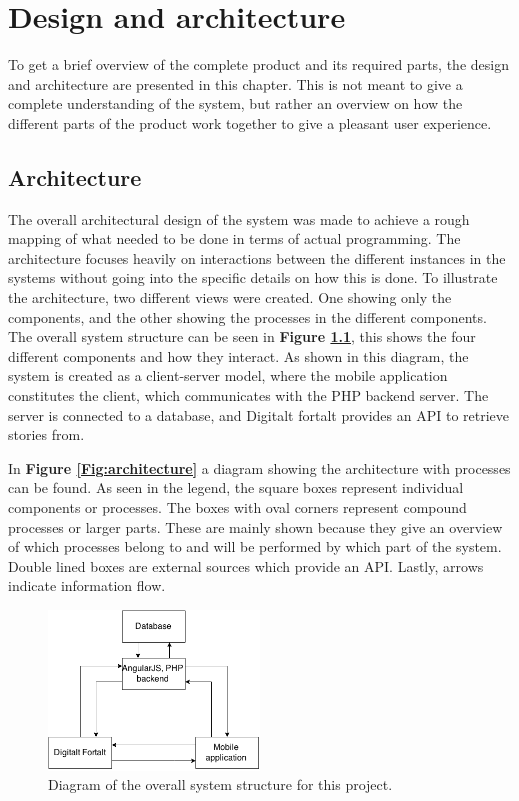 
\chapter{Design and architecture}

To get a brief overview of the complete product and its required parts, the design and architecture are presented in this chapter. This is not meant to give a complete understanding of the system, but rather an overview on how the different parts of the product work together to give a pleasant user experience.

\section{Architecture}

The overall architectural design of the system was made to achieve a rough mapping of what needed to be done in terms of actual programming. The architecture focuses heavily on interactions between the different instances in the systems without going into the specific details on how this is done. To illustrate the architecture, two different views were created. One showing only the components, and the other showing the processes in the different components. The overall system structure can be seen in \textbf{Figure \ref{Fig:system_structure}}, this shows the four different components and how they interact. As shown in this diagram, the system is created as a client-server model, where the mobile application constitutes the client, which communicates with the PHP backend server. The server is connected to a database, and Digitalt fortalt provides an API to retrieve stories from.\newline

In \textbf{Figure \ref{Fig:architecture}} a diagram showing the architecture with processes can be found. As seen in the legend, the square boxes represent individual components or processes. The boxes with oval corners represent compound processes or larger parts. These are mainly shown because they give an overview of which processes belong to and will be performed by which part of the system. Double lined boxes are external sources which provide an API. Lastly, arrows indicate information flow.

\begin{figure}[h!]
	\centering
	\includegraphics[width=0.5\textwidth]{fig/system_structure}
	\caption{Diagram of the overall system structure for this project.}
	\label{Fig:system_structure}
\end{figure}


